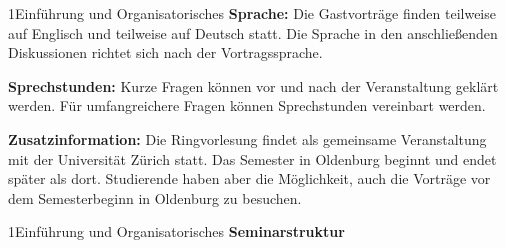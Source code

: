 \documentclass[xcolor=table,9pt,aspectratio=169]{beamer}
\begin{document}
\begin{frame}{\vspace*{10mm}1\hspace*{1em}Einführung und Organisatorisches}
\textbf{Sprache:} Die Gastvorträge finden teilweise auf Englisch und teilweise auf Deutsch statt.
Die Sprache in den anschließenden Diskussionen richtet sich nach der Vortragssprache.

\medskip
\textbf{Sprechstunden:} Kurze Fragen können vor und nach der Veranstaltung geklärt werden. Für umfangreichere Fragen können Sprechstunden vereinbart werden.

\medskip
\textbf{Zusatzinformation:} Die Ringvorlesung findet als gemeinsame Veranstaltung mit der Universität Zürich statt.
Das Semester in Oldenburg beginnt und endet später als dort.
Studierende haben aber die Möglichkeit, auch die Vorträge vor dem Semesterbeginn in Oldenburg zu besuchen.
\end{frame}


\begin{frame}{\vspace*{10mm}1\hspace*{1em}Einführung und Organisatorisches}
\textbf{Seminarstruktur}
\begin{center}
\end{center}
\end{frame}
\end{document}
